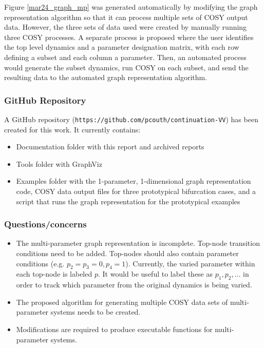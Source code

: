 \documentclass[12pt]{article}
\begin{document}
Figure \ref{mar24_graph_mp} was generated automatically by modifying the graph representation algorithm so that it can process multiple sets of COSY output data. However, the three sets of data used were created by manually running three COSY processes. A separate process is proposed where the user identifies the top level dynamics and a parameter designation matrix, with each row defining a subset and each column a parameter. Then, an automated process would generate the subset dynamics, run COSY on each subset, and send the resulting data to the automated graph representation algorithm.


\subsubsection{GitHub Repository}
A GitHub repository (\texttt{https://github.com/pcouth/continuation-VV}) has been created for this work. It currently contains:

\begin{itemize}
\item Documentation folder with this report and archived reports
\item Tools folder with GraphViz
\item Examples folder with the 1-parameter, 1-dimensional graph representation code, COSY data output files for three prototypical bifurcation cases, and a script that runs the graph representation for the prototypical examples
\end{itemize}


\subsubsection{Questions/concerns}
\begin{itemize}
\item The multi-parameter graph representation is incomplete. Top-node transition conditions need to be added. Top-nodes should also contain parameter conditions (e.g. $p_2=p_3=0, p_4=1$). Currently, the varied parameter within each top-node is labeled $p$. It would be useful to label these as $p_1,p_2,...$ in order to track which parameter from the original dynamics is being varied.
\item The proposed algorithm for generating multiple COSY data sets of multi-parameter systems needs to be created.
\item Modifications are required to produce executable functions for multi-parameter systems.
\end{itemize}
\end{document}
